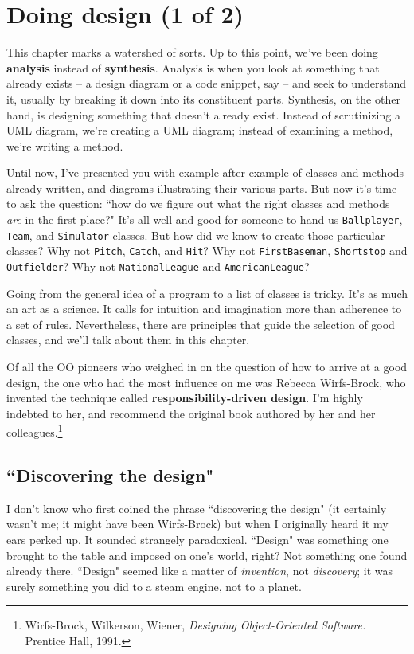
\chapter{Doing design (1 of 2)}

This chapter marks a watershed of sorts. Up to this point, we've been doing
\textbf{analysis} instead of \textbf{synthesis}. Analysis is when you look at
something that already exists -- a design diagram or a code snippet, say --
and seek to understand it, usually by breaking it down into its constituent
parts. Synthesis, on the other hand, is designing something that doesn't
already exist. Instead of scrutinizing a UML diagram, we're creating a UML
diagram; instead of examining a method, we're writing a method.

Until now, I've presented you with example after example of classes and
methods already written, and diagrams illustrating their various parts. But
now it's time to ask the question: ``how do we figure out what the right
classes and methods \textit{are} in the first place?" It's all well and good
for someone to hand us \texttt{Ballplayer}, \texttt{Team}, and
\texttt{Simulator} classes. But how did we know to create those particular
classes? Why not \texttt{Pitch}, \texttt{Catch}, and \texttt{Hit}? Why not
\texttt{FirstBaseman}, \texttt{Shortstop} and \texttt{Outfielder}? Why not
\texttt{NationalLeague} and \texttt{AmericanLeague}?

Going from the general idea of a program to a list of classes is tricky. It's
as much an art as a science. It calls for intuition and imagination more than
adherence to a set of rules. Nevertheless, there are principles that guide the
selection of good classes, and we'll talk about them in this chapter.

Of all the OO pioneers who weighed in on the question of how to arrive at a
good design, the one who had the most influence on me was Rebecca Wirfs-Brock,
who invented the technique called \textbf{responsibility-driven design}. I'm
highly indebted to her, and recommend the original book authored by her and
her colleagues.\footnote{Wirfs-Brock, Wilkerson, Wiener, \textit{Designing
Object-Oriented Software.} Prentice Hall, 1991.}

\section{``Discovering the design"}

I don't know who first coined the phrase ``discovering the design" (it
certainly wasn't me; it might have been Wirfs-Brock) but when I originally
heard it my ears perked up. It sounded strangely paradoxical. ``Design" was
something one brought to the table and imposed on one's world, right? Not
something one found already there. ``Design" seemed like a matter of
\textit{invention}, not \textit{discovery}; it was surely something you did to
a steam engine, not to a planet.

